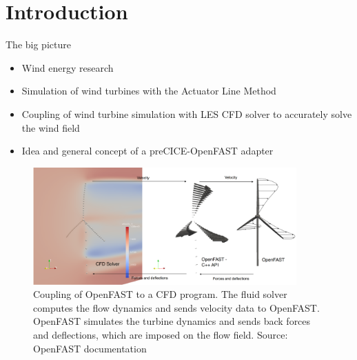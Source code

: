 \section{Introduction}

The big picture
\\
 \begin{itemize}
 	\item Wind energy research
 	\item Simulation of wind turbines with the Actuator Line Method
 	\item Coupling of wind turbine simulation with LES CFD solver to accurately solve the wind field
 	\item Idea and general concept of a preCICE-OpenFAST adapter
 	\\
 \end{itemize}

\begin{figure}[h]
	\centering
	\includegraphics[width=0.9\textwidth]{images/openfast-coupling-scheme.png}
	\caption{Coupling of OpenFAST to a CFD program. The fluid solver computes the flow dynamics and sends velocity data to OpenFAST. OpenFAST simulates the turbine dynamics and sends back forces and deflections, which are imposed on the flow field. Source: OpenFAST documentation\protect\footnotemark}
	\label{fig:openfast:coupling}
\end{figure}


